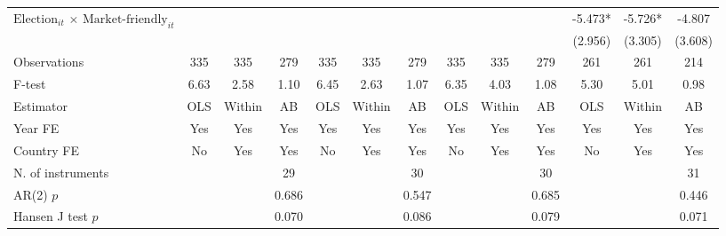 \begin{longtable}{m{5cm}*{12}{c}}
\multirow{2}{5cm}{$\text{Election}_{it}$ $\times$ $\text{Market-friendly}_{it}$}&               &               &               &               &               &               &               &               &               &      -5.473*  &      -5.726*  &      -4.807   \\
                    &               &               &               &               &               &               &               &               &               &     (2.956)   &     (3.305)   &     (3.608)   \\
\midrule
Observations        &         335   &         335   &         279   &         335   &         335   &         279   &         335   &         335   &         279   &         261   &         261   &         214   \\
F-test              &        6.63   &        2.58   &        1.10   &        6.45   &        2.63   &        1.07   &        6.35   &        4.03   &        1.08   &        5.30   &        5.01   &        0.98   \\
Estimator           &         OLS   &      Within   &          AB   &         OLS   &      Within   &          AB   &         OLS   &      Within   &          AB   &         OLS   &      Within   &          AB   \\
Year FE             &         Yes   &         Yes   &         Yes   &         Yes   &         Yes   &         Yes   &         Yes   &         Yes   &         Yes   &         Yes   &         Yes   &         Yes   \\
Country FE          &          No   &         Yes   &         Yes   &          No   &         Yes   &         Yes   &          No   &         Yes   &         Yes   &          No   &         Yes   &         Yes   \\
N. of instruments   &               &               &          29   &               &               &          30   &               &               &          30   &               &               &          31   \\
AR(2) \(p\)         &               &               &       0.686   &               &               &       0.547   &               &               &       0.685   &               &               &       0.446   \\
Hansen J test \(p\) &               &               &       0.070   &               &               &       0.086   &               &               &       0.079   &               &               &       0.071   \\

\end{longtable}
